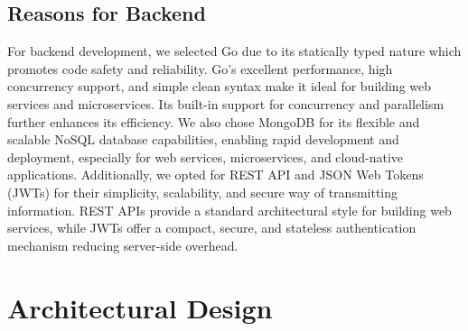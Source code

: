\documentclass[11pt,a4paper]{article}
\begin{document}
\subsection*{Reasons for Backend}
For backend development, we selected Go due to its statically typed nature which promotes code safety and reliability. Go's excellent performance, high concurrency support, and simple clean syntax make it ideal for building web services and microservices. Its built-in support for concurrency and parallelism further enhances its efficiency. We also chose MongoDB for its flexible and scalable NoSQL database capabilities, enabling rapid development and deployment, especially for web services, microservices, and cloud-native applications. Additionally, we opted for REST API and JSON Web Tokens (JWTs) for their simplicity, scalability, and secure way of transmitting information. REST APIs provide a standard architectural style for building web services, while JWTs offer a compact, secure, and stateless authentication mechanism reducing server-side overhead.

\section*{Architectural Design}
\end{document}
